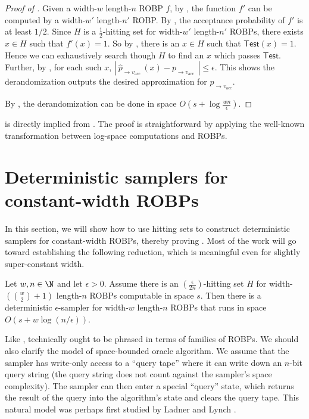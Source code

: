 \documentclass{toc}
\begin{document}
\begin{proof}[Proof of ] 
Given a width-$w$ length-$n$ ROBP $f$, by , the function $f'$ can be computed by  a width-$w' $ length-$n' $ ROBP. By , the acceptance probability of $f'$ is at least $1/2$. Since $H$ is a $\frac{1}{2}$-hitting set for width-$w'$ length-$n'$ ROBPs, there exists $x\in H$ such that $f'(x) = 1$. So by , there is an $x\in H$ such that $\mathsf{Test}(x) = 1$. Hence we can  exhaustively search though $H$ to find an $x$ which passes $\mathsf{Test}$. Further, by , for each such $x$, $ |\: \widehat{p}_{ \to v_{\text{acc }} }(x)  - p_{ \to v_{\text{acc }} } \:| \leq \epsilon$. This shows the derandomization  outputs the desired approximation for $p_{ \to v_{\text{acc}} }$.

By , the derandomization can be done in space  $O(s+\log \frac{wn}{\epsilon})$.
\end{proof}

 is directly implied from . The proof is  straightforward by applying the %
well-known %
transformation between %
log-space %
computations and ROBPs.

\section{Deterministic samplers for constant-width ROBPs} \label{sec:constwidth}

In this section, we will show how to use hitting sets to construct deterministic samplers for constant-width ROBPs, thereby proving . Most of the work will go toward establishing the following reduction, which is meaningful even for slightly super-constant width.

\begin{theorem} \label{thm:const-width-reduction}
Let $w, n \in \N$ and let $\epsilon > 0$. Assume there is an $(\frac{\epsilon}{2n})$-hitting set $H$ for width-$(\binom{w}{2} + 1)$ length-$n$ ROBPs computable in space $s$. Then there is a deterministic $\epsilon$-sampler for width-$w$ length-$n$ ROBPs that runs in space $O(s + w \log(n/\epsilon))$.
\end{theorem}

Like ,  technically ought to be phrased in terms of families of ROBPs. We should also clarify the model of space-bounded oracle algorithm. We assume that the sampler has write-only access to a ``query tape'' where it can write down an $n$-bit query string (the query string does not count against the sampler's space complexity). The sampler can then enter a special ``query'' state, which returns the result of the query into the algorithm's state and clears the query tape. This natural model was perhaps first studied by Ladner and Lynch \cite{LL76}.
\end{document}

